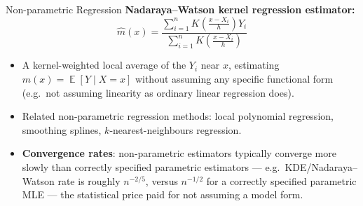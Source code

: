 \documentclass[11pt,aspectratio=169]{beamer}
\newcommand{\E}{\operatorname{\mathbb{E}}}
\begin{document}
\begin{frame}{Non-parametric Regression}
\textbf{Nadaraya--Watson kernel regression estimator:}
\[
    \hat m(x)=\frac{\sum_{i=1}^n K\!\left(\frac{x-X_i}{h}\right) Y_i}
                    {\sum_{i=1}^n K\!\left(\frac{x-X_i}{h}\right)}
\]
\begin{itemize}
    \item A kernel-weighted local average of the $Y_i$ near $x$, estimating
          $m(x)=\E[Y\mid X=x]$ without assuming any specific functional
          form (e.g.\ not assuming linearity as ordinary linear regression
          does).
    \item Related non-parametric regression methods: local polynomial
          regression, smoothing splines, $k$-nearest-neighbours regression.
    \item \textbf{Convergence rates}: non-parametric estimators typically
          converge more slowly than correctly specified parametric
          estimators — e.g.\ KDE/Nadaraya--Watson rate is roughly
          $n^{-2/5}$, versus $n^{-1/2}$ for a correctly specified parametric
          MLE — the statistical price paid for not assuming a model form.
\end{itemize}
\end{frame}
\end{document}
